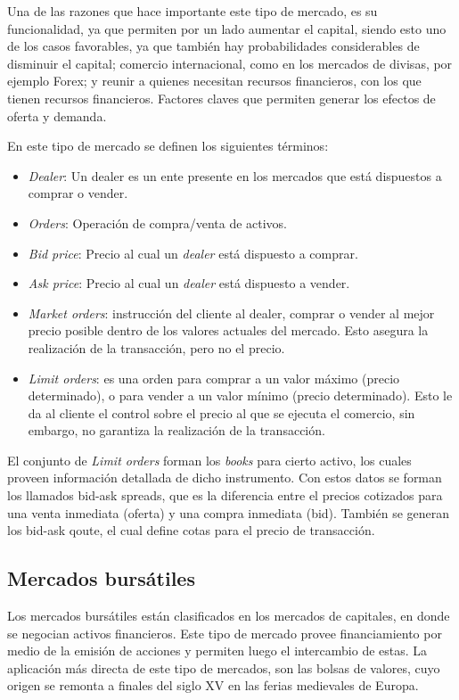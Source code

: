 Una de las razones que hace importante este tipo de mercado, es su funcionalidad, ya que permiten por un lado aumentar el capital, siendo esto uno 
de los casos favorables, ya que también hay probabilidades considerables de disminuir el capital; comercio internacional, como en los mercados de 
divisas, por ejemplo Forex; y reunir a quienes necesitan recursos financieros, con los que tienen recursos financieros. Factores claves
que permiten generar los efectos de oferta y demanda.

En este tipo de mercado se definen los siguientes términos:
\begin{itemize}
	\item \emph{Dealer}: Un dealer es un ente presente en los mercados que está dispuestos a comprar o vender.
	\item \emph{Orders}: Operación de compra/venta de activos.
	\item \emph{Bid price}: Precio al cual un \emph{dealer} está dispuesto a comprar.
	\item \emph{Ask price}: Precio al cual un \emph{dealer} está dispuesto a vender.
	\item \emph{Market orders}: instrucción del cliente al dealer, comprar o vender al mejor precio posible dentro de los valores actuales del mercado.
		Esto asegura la realización de la transacción, pero no el precio.
	\item \emph{Limit orders}: es una orden para comprar a un valor máximo (precio determinado), o para vender a un valor mínimo (precio determinado).
		Esto le da al cliente el control sobre el precio al que se ejecuta el comercio, sin embargo, no garantiza la realización de la transacción.
\end{itemize}

El conjunto de \emph{Limit orders} forman los \emph{books} para cierto activo, los cuales proveen información detallada de dicho instrumento. Con estos datos
se forman los llamados bid-ask spreads, que es la diferencia entre el precios cotizados para una venta inmediata (oferta) y una compra inmediata (bid). 
También se generan los bid-ask qoute, el cual define cotas para el precio de transacción.

\subsection{Mercados bursátiles}
Los mercados bursátiles están clasificados en los mercados de capitales, en donde se negocian activos financieros. Este tipo de mercado provee financiamiento
por medio de la emisión de acciones y permiten luego el intercambio de estas. La aplicación más directa de este tipo de mercados, son las bolsas de valores, cuyo
origen se remonta a finales del siglo XV en las ferias medievales de Europa.

